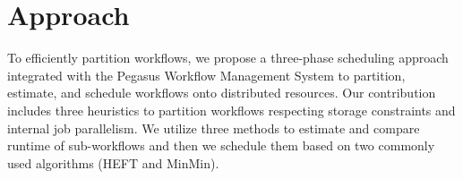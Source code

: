 

\section{Approach}

To efficiently partition workflows, we propose a three-phase scheduling approach integrated with the Pegasus Workflow Management System to partition, estimate, and schedule workflows onto distributed resources. Our contribution includes three heuristics to partition workflows respecting storage constraints and internal job parallelism. We utilize three methods to estimate and compare runtime of sub-workflows and then we schedule them based on two commonly used algorithms (HEFT\cite{Topcuoglu2002} and MinMin\cite{Blythe2005}).  

